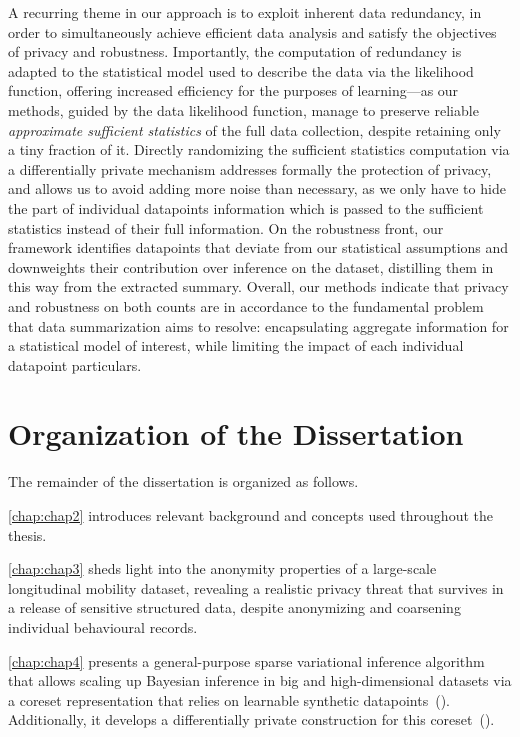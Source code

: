 A recurring theme in our approach is to exploit inherent data redundancy, in order to simultaneously achieve efficient data analysis and satisfy the objectives of privacy and robustness. Importantly, the computation of redundancy is adapted to the statistical model used to describe the data via the likelihood function, offering increased efficiency for the purposes of learning---as our methods, guided by the data likelihood function, manage to preserve reliable \emph{approximate sufficient statistics} of the full data collection, despite retaining only a tiny fraction of it. Directly randomizing the sufficient statistics computation via a differentially private mechanism addresses formally the protection of privacy, and allows us to avoid adding more noise than necessary, as we only have to hide the part of individual datapoints information which is passed to the sufficient statistics instead of their full information. On the robustness front, our framework identifies datapoints that deviate from our statistical assumptions and downweights their contribution over inference on the dataset, distilling them in this way from the extracted summary. Overall, our methods indicate that privacy and robustness on both counts are in accordance to the fundamental problem that data summarization aims to resolve: encapsulating aggregate information for a statistical model of interest, while limiting the impact of each individual datapoint particulars.


\section{Organization of the Dissertation}
\label{sec:thesis-organization}
The remainder of the dissertation is organized as follows. 

\cref{chap:chap2} introduces relevant background and concepts used throughout the thesis. 

\cref{chap:chap3} sheds light into the anonymity properties of a large-scale longitudinal mobility dataset, revealing a realistic privacy threat that survives in a release of sensitive structured data, despite anonymizing and coarsening individual behavioural records. 

\cref{chap:chap4} presents a general-purpose sparse variational inference algorithm that allows scaling up Bayesian inference in big and high-dimensional datasets via a coreset representation that relies on learnable synthetic datapoints~(\psvi). Additionally, it develops a differentially private construction for this coreset~(\dpsvi). 

